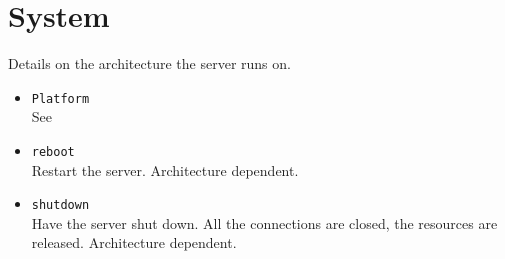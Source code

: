 \section{System}
Details on the architecture the \urbi server runs on.

\begin{itemize}
\item \lstinline'Platform'\\
  See 

\item \lstinline'reboot'\\
  Restart the \urbi server.  Architecture dependent.

\item \lstinline'shutdown'\\
  Have the \urbi server shut down.  All the connections are closed,
  the resources are released.  Architecture dependent.
\end{itemize}

